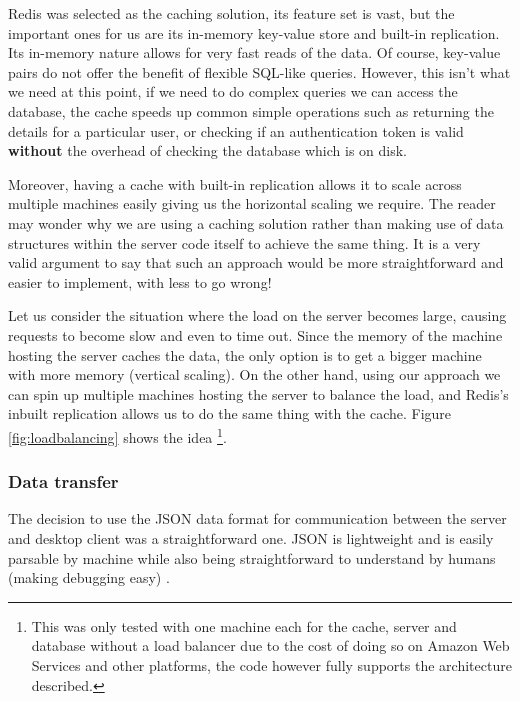 Redis \cite{redis} was selected as the caching solution, its feature set is vast, but the important ones for us are its in-memory key-value store and built-in replication. Its in-memory nature allows for very fast reads of the data. Of course, key-value pairs do not offer the benefit of flexible SQL-like queries. However, this isn't what we need at this point, if we need to do complex queries we can access the database, the cache speeds up common simple operations such as returning the details for a particular user, or checking if an authentication token is valid \textbf{without} the overhead of checking the database which is on disk.

Moreover, having a cache with built-in replication allows it to scale across multiple machines easily giving us the horizontal scaling we require. The reader may wonder why we are using a caching solution rather than making use of data structures within the server code itself to achieve the same thing. It is a very valid argument to say that such an approach would be more straightforward and easier to implement, with less to go wrong!

Let us consider the situation where the load on the server becomes large, causing requests to become slow and even to time out. Since the memory of the machine hosting the server caches the data, the only option is to get a bigger machine with more memory (vertical scaling). On the other hand, using our approach we can spin up multiple machines hosting the server to balance the load, and Redis's inbuilt replication allows us to do the same thing with the cache. Figure \ref{fig:loadbalancing} shows the idea \footnote{This was only tested with one machine each for the cache, server and database without a load balancer due to the cost of doing so on Amazon Web Services and other platforms, the code however fully supports the architecture described.}.


\subsubsection{Data transfer}

The decision to use the JSON data format for communication between the server and desktop client was a straightforward one. JSON is lightweight and is easily parsable by machine while also being straightforward to understand by humans (making debugging easy) \cite{json}.

